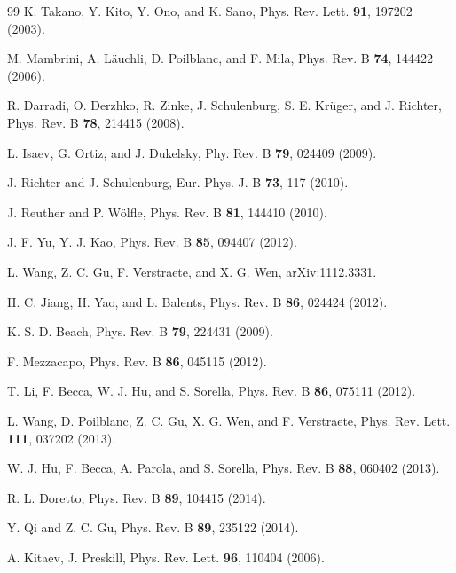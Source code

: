 \documentclass[prl,aps,epsf,showpacs,twocolumn]{revtex4}
\begin{document}
\begin{thebibliography}{99}
 K. Takano, Y. Kito, Y. Ono, and K. Sano, Phys. Rev. Lett. \textbf{91}, 197202 (2003). 

 M. Mambrini, A. L\"{a}uchli, D. Poilblanc, and F. Mila, Phys. Rev. B \textbf{74}, 144422 (2006). %

 R. Darradi, O. Derzhko, R. Zinke, J. Schulenburg, S. E. Kr\"{u}ger, and J. Richter, Phys. Rev. B \textbf{78}, 214415 (2008). %

 L. Isaev, G. Ortiz, and J. Dukelsky, Phy. Rev. B \textbf{79}, 024409 (2009). %

 J. Richter and J. Schulenburg, Eur. Phys. J. B \textbf{73}, 117 (2010).

 J. Reuther and P. W\"{o}lfle, Phys. Rev. B \textbf{81}, 144410 (2010). %

 J. F. Yu, Y. J. Kao, Phys. Rev. B \textbf{85}, 094407 (2012). %

 L. Wang, Z. C. Gu, F. Verstraete, and X. G. Wen, arXiv:1112.3331.

 H. C. Jiang, H. Yao, and L. Balents, Phys. Rev. B \textbf{86}, 024424 (2012).

 K. S. D. Beach, Phys. Rev. B \textbf{79}, 224431 (2009).

 F. Mezzacapo, Phys. Rev. B \textbf{86}, 045115 (2012). %

 T. Li, F. Becca, W. J. Hu, and S. Sorella, Phys. Rev. B \textbf{86}, 075111 (2012). %

 L. Wang, D. Poilblanc, Z. C. Gu, X. G. Wen, and F. Verstraete, Phys. Rev. Lett. \textbf{111}, 037202 (2013).

 W. J. Hu, F. Becca, A. Parola, and S. Sorella, Phys. Rev. B \textbf{88}, 060402 (2013).

 R. L. Doretto, Phys. Rev. B \textbf{89}, 104415 (2014).

 Y. Qi and Z. C. Gu, Phys. Rev. B \textbf{89}, 235122 (2014).

 A. Kitaev, J. Preskill, Phys. Rev. Lett. \textbf{96}, 110404 (2006).


\end{thebibliography}
\end{document}
